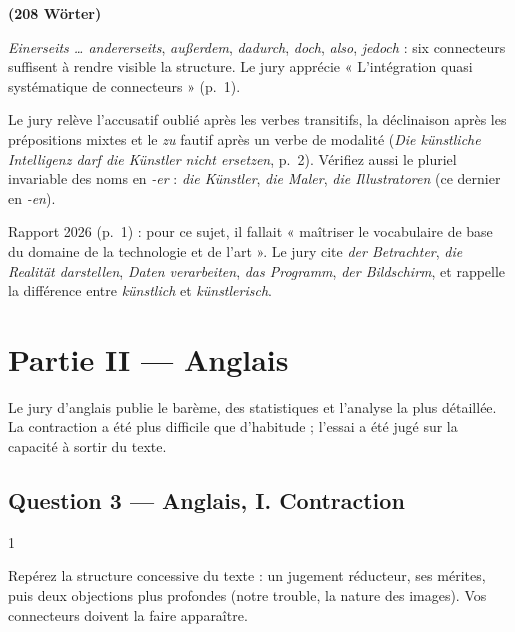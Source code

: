 \documentclass[11pt,a4paper]{article}
\begin{document}
\textbf{(208 Wörter)}

\begin{methode}

\emph{Einerseits \ldots{} andererseits}, \emph{außerdem}, \emph{dadurch}, \emph{doch}, \emph{also}, \emph{jedoch} : six connecteurs suffisent à rendre visible la structure. Le jury apprécie « L'intégration quasi systématique de connecteurs » (p.~1).

\end{methode}

\begin{piege}

Le jury relève l'accusatif oublié après les verbes transitifs, la déclinaison après les prépositions mixtes et le \emph{zu} fautif après un verbe de modalité (\emph{Die künstliche Intelligenz darf die Künstler nicht ersetzen}, p.~2). Vérifiez aussi le pluriel invariable des noms en \emph{-er} : \emph{die Künstler}, \emph{die Maler}, \emph{die Illustratoren} (ce dernier en \emph{-en}).

\end{piege}

\begin{jury}

Rapport 2026 (p.~1) : pour ce sujet, il fallait « maîtriser le vocabulaire de base du domaine de la technologie et de l'art ». Le jury cite \emph{der Betrachter}, \emph{die Realität darstellen}, \emph{Daten verarbeiten}, \emph{das Programm}, \emph{der Bildschirm}, et rappelle la différence entre \emph{künstlich} et \emph{künstlerisch}.

\end{jury}

\hypertarget{partie-ii-anglais}{%
\section{Partie II --- Anglais}\label{partie-ii-anglais}}

Le jury d'anglais publie le barème, des statistiques et l'analyse la plus détaillée. La contraction a été plus difficile que d'habitude ; l'essai a été jugé sur la capacité à sortir du texte.

\hypertarget{question-3-anglais-i.-contraction}{%
\subsection{Question 3 --- Anglais, I. Contraction}\label{question-3-anglais-i.-contraction}}

\begin{indication}{1}

Repérez la structure concessive du texte : un jugement réducteur, ses mérites, puis deux objections plus profondes (notre trouble, la nature des images). Vos connecteurs doivent la faire apparaître.

\end{indication}
\end{document}
